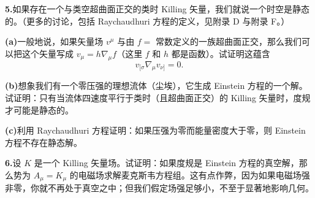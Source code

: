\textbf{5.}\quad 如果存在一个与类空超曲面正交的类时 Killing 矢量，我们就说一个时空是静态的。（更多的讨论，包括 Raychaudhuri 方程的定义，见附录 D 与附录 F。）

\textbf{(a)}\quad 一般地说，如果矢量场 $v^{\mu}$ 与由 $f=$ 常数定义的一族超曲面正交，那么我们可以把这个矢量写成 $v_{\mu}=h\nabla_{\mu}f$（这里 $f$ 和 $h$ 都是函数）。试证明这蕴含
\begin{equation*}
v_{[\sigma}\nabla_{\mu}v_{\nu]} = 0.
\end{equation*}

\textbf{(b)}\quad 想象我们有一个零压强的理想流体（尘埃），它生成 Einstein 方程的一个解。试证明：只有当流体四速度平行于类时（且超曲面正交）的 Killing 矢量时，度规才可能是静态的。

\textbf{(c)}\quad 利用 Raychaudhuri 方程证明：如果压强为零而能量密度大于零，则 Einstein 方程不存在静态解。

\textbf{6.}\quad 设 $K$ 是一个 Killing 矢量场。试证明：如果度规是 Einstein 方程的真空解，那么势为 $A_{\mu}=K_{\mu}$ 的电磁场求解麦克斯韦方程组。这有点作弊，因为如果电磁场强非零，你就不再处于真空之中；但我们假定场强足够小，不至于显著地影响几何。

